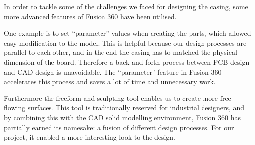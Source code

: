 In order to tackle some of the challenges we faced for designing the casing, some more advanced features of Fusion 360 have been utilised.

One example is to set “parameter” values when creating the parts, which allowed easy modification to the model. This is helpful because our design processes are parallel to each other, and in the end the casing has to matched the physical dimension of the board. Therefore a back-and-forth process between PCB design and CAD design is unavoidable. The “parameter” feature in Fusion 360 accelerates this process and saves a lot of time and unnecessary work.

Furthermore the freeform and sculpting tool enables us to create more free flowing surfaces. This tool is traditionally reserved for industrial designers, and by combining this with the CAD solid modelling environment, Fusion 360 has partially earned its namesake: a fusion of different design processes. For our project, it enabled a more interesting look to the design.

\FloatBarrier
\vspace{1cm}


